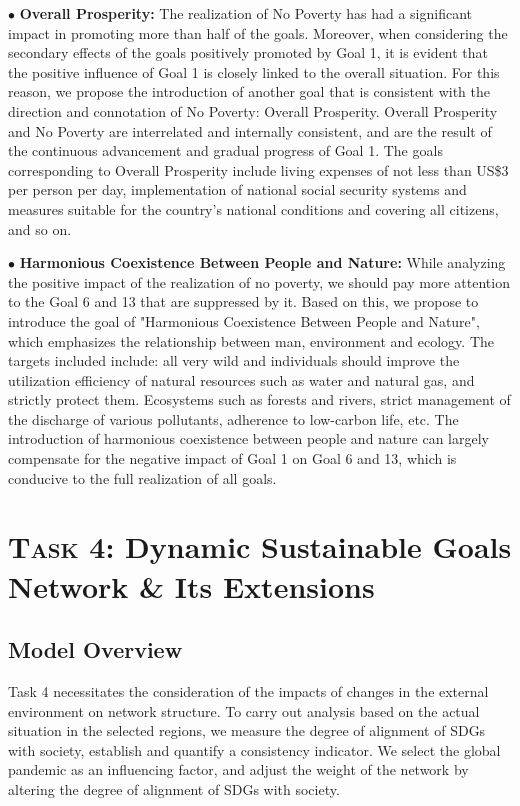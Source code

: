 \documentclass[12pt]{article}  %
\begin{document}
$\bullet$ \textbf{Overall Prosperity:} The realization of No Poverty has had a significant impact in promoting more than half of the goals. Moreover, when considering the secondary effects of the goals positively promoted by Goal 1, it is evident that the positive influence of Goal 1 is closely linked to the overall situation. For this reason, we propose the introduction of another goal that is consistent with the direction and connotation of No Poverty: Overall Prosperity. Overall Prosperity and No Poverty are interrelated and internally consistent, and are the result of the continuous advancement and gradual progress of Goal 1. The goals corresponding to Overall Prosperity include living expenses of not less than US\$3 per person per day, implementation of national social security systems and measures suitable for the country’s national conditions and covering all citizens, and so on.

$\bullet$ \textbf{Harmonious Coexistence Between People and Nature:} While analyzing the positive impact of the realization of no poverty, we should pay more attention to the Goal 6 and 13 that are suppressed by it. Based on this, we propose to introduce the goal of "Harmonious Coexistence Between People and Nature", which emphasizes the relationship between man, environment and ecology. The targets included include: all very wild and individuals should improve the utilization efficiency of natural resources such as water and natural gas, and strictly protect them. Ecosystems such as forests and rivers, strict management of the discharge of various pollutants, adherence to low-carbon life, etc. The introduction of harmonious coexistence between people and nature can largely compensate for the negative impact of Goal 1 on Goal 6 and 13, which is conducive to the full realization of all goals.




\section{\textsc{Task 4:} Dynamic Sustainable Goals Network \& Its Extensions}
\subsection{Model Overview}
Task 4 necessitates the consideration of the impacts of changes in the external environment on network structure. To carry out analysis based on the actual situation in the selected regions, we measure the degree of alignment of SDGs with society, establish and quantify a consistency indicator. We select the global pandemic  as an influencing factor,  and adjust the weight of the network by altering the degree of alignment of SDGs with society.
\end{document}
